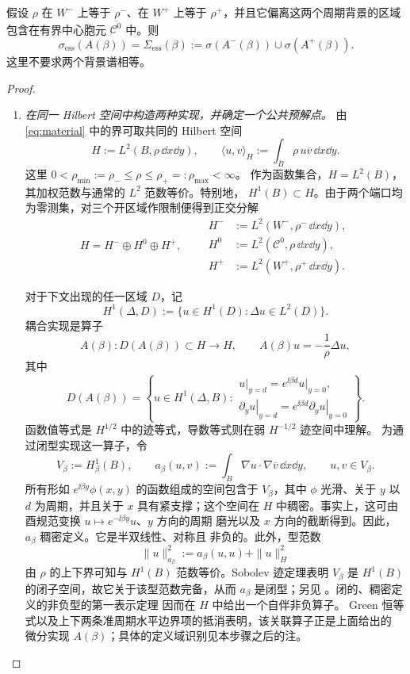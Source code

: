 \begin{proposition}[两个不同半波导对应的本质谱]
\label{prop:asymmetric-essential-spectrum}
假设 $\rho$ 在 $W^-$ 上等于 $\rho^-$、在 $W^+$ 上等于 $\rho^+$，并且它偏离这两个周期背景的区域包含在有界中心胞元 $\overline{\mathcal C^0}$ 中。则
\begin{equation}
  \boxed{\quad
  \sigma_{\mathrm{ess}}(A(\beta))
  =\Sigma_{\mathrm{ess}}(\beta)
  :=\sigma(A^-(\beta))\cup\sigma(A^+(\beta)).\quad}
  \label{eq:projected-spectrum}
\end{equation}
这里不要求两个背景谱相等。
\end{proposition}
\begin{proof}
\begin{enumerate}[label=\textit{步骤 \arabic*.},leftmargin=*]
\item \emph{在同一 Hilbert 空间中构造两种实现，并确定一个公共预解点。}
由 \eqref{eq:material} 中的界可取共同的 Hilbert 空间
\[
  H:=L^2(B,\rho\,\dd x\dd y),
  \qquad
  \langle u,v\rangle_H
  :=\int_B\rho\,u\overline v\,\dd x\dd y.
\]
这里 $0<\rho_{\min}:=\rho_-\leq\rho\leq\rho_+=:\rho_{\max}<\infty$。
作为函数集合，$H=L^2(B)$，其加权范数与通常的 $L^2$ 范数等价。特别地，
$H^1(B)\subset H$。由于两个端口均为零测集，对三个开区域作限制便得到正交分解
\[
  H=H^-\oplus H^0\oplus H^+,
  \qquad
  \begin{aligned}
    H^-&:=L^2(W^-,\rho^-\,\dd x\dd y),\\
    H^0&:=L^2(\mathcal C^0,\rho\,\dd x\dd y),\\
    H^+&:=L^2(W^+,\rho^+\,\dd x\dd y).
  \end{aligned}
\]

对于下文出现的任一区域 $D$，记
\[
  H^1(\Delta,D):=\{u\in H^1(D):\Delta u\in L^2(D)\}.
\]
耦合实现是算子
\[
  A(\beta):D(A(\beta))\subset H\longrightarrow H,
  \qquad A(\beta)u=-\frac1\rho\Delta u,
\]
其中
\[
  D(A(\beta))=\left\{u\in H^1(\Delta,B):
  \begin{array}{l}
    \left.u\right|_{y=d}
      =e^{\ii\beta d}\left.u\right|_{y=0},\\[-1mm]
    \left.\partial_yu\right|_{y=d}
      =e^{\ii\beta d}\left.\partial_yu\right|_{y=0}
  \end{array}\right\}.
\]
函数值等式是 $H^{1/2}$ 中的迹等式，导数等式则在弱 $H^{-1/2}$ 迹空间中理解。
为通过闭型实现这一算子，令
\[
  V_\beta:=H^1_\beta(B),
  \qquad
  a_\beta(u,v):=\int_B\nabla u\cdot\nabla\overline v\,\dd x\dd y,
  \qquad u,v\in V_\beta.
\]
所有形如 $e^{\ii\beta y}\phi(x,y)$ 的函数组成的空间包含于 $V_\beta$，其中
$\phi$ 光滑、关于 $y$ 以 $d$ 为周期，并且关于 $x$ 具有紧支撑；这个空间在 $H$
中稠密。事实上，这可由酉规范变换 $u\mapsto e^{-\ii\beta y}u$、$y$ 方向的周期
磨光以及 $x$ 方向的截断得到。因此，$a_\beta$ 稠密定义。它是半双线性、对称且
非负的。此外，型范数
\[
  \|u\|_{a_\beta}^2
  :=a_\beta(u,u)+\|u\|_H^2
\]
由 $\rho$ 的上下界可知与 $H^1(B)$ 范数等价。Sobolev 迹定理表明 $V_\beta$ 是
$H^1(B)$ 的闭子空间，故它关于该型范数完备，从而 $a_\beta$ 是闭型；另见
\cite[Chapter~3]{McLean2000}。闭的、稠密定义的非负型的第一表示定理
\cite[Chapter~VI, Section~2]{Kato1995} 因而在 $H$ 中给出一个自伴非负算子。
Green 恒等式以及上下两条准周期水平边界项的抵消表明，该关联算子正是上面给出的
微分实现 $A(\beta)$；具体的定义域识别见本步骤之后的注。


\end{enumerate}
\end{proof}
